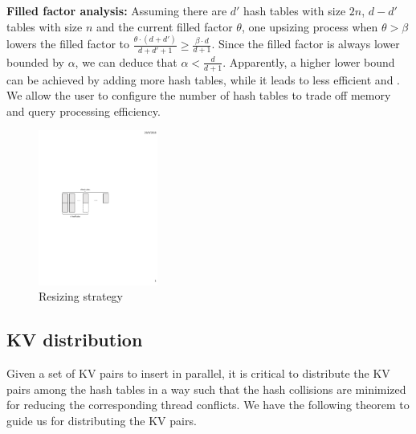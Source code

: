 \vspace{1mm}
\noindent\textbf{Filled factor analysis:}
Assuming there are $d'$ hash tables with size $2n$, $d-d'$ tables with size $n$ and the current filled factor $\theta$, 
one upsizing process when $\theta > \beta$ lowers the filled factor to $\frac{\theta\cdot(d+d')}{d+d'+1} \geq \frac{\beta \cdot d}{d+1}$.  
Since the filled factor is always lower bounded by $\alpha$, we can deduce that $\alpha < \frac{d}{d+1}$.
Apparently, a higher lower bound can be achieved by adding more hash tables, while it leads to less efficient  and . 
We allow the user to configure the number of hash tables to trade off memory and query processing efficiency. 

\begin{figure}[t]
	\centering
	\includegraphics[width=0.35\textwidth]{fig/MultiTable.pdf}
	\caption{Resizing strategy}
	\label{fig:resize}
\end{figure}
\subsection{KV distribution}\label{sec:dyn:distribute}
Given a set of KV pairs to insert in parallel, it is critical to distribute the KV pairs among the hash tables in a way such that the hash collisions are minimized for reducing the corresponding thread conflicts. We have the following theorem to guide us for distributing the KV pairs. 

